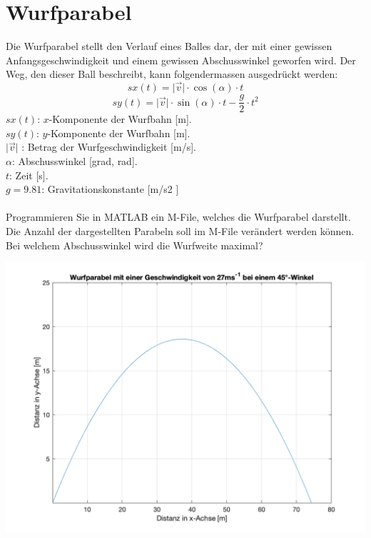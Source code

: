 \section{Wurfparabel}
Die Wurfparabel stellt den Verlauf eines Balles dar, der mit einer gewissen Anfangsgeschwindigkeit und einem gewissen Abschusswinkel geworfen wird.
Der Weg, den dieser Ball beschreibt, kann folgendermassen ausgedrückt werden:
\begin{equation}
sx\left(t\right)=\Big\vert\overrightarrow{v}\Big\vert\cdot \cos\left(\alpha\right)\cdot t
\end{equation}
\begin{equation}
sy\left(t\right)=\Big\vert\overrightarrow{v}\Big\vert\cdot\sin\left(\alpha\right)\cdot t-\dfrac{g}{2}\cdot t^2 
\end{equation}
$sx(t)$: $x$-Komponente der Wurfbahn [m].\\
$sy(t)$: $y$-Komponente der Wurfbahn [m].\\
$\Big\vert \overrightarrow{v}\Big\vert$ : Betrag der Wurfgeschwindigkeit [m/s].\\
$\alpha$: Abschusswinkel [grad, rad].\\
$t$: Zeit [s].\\
$g = 9.81$: Gravitationskonstante [m/s2
]\\\\
Programmieren Sie in MATLAB ein M-File, welches die Wurfparabel darstellt. Die Anzahl der
dargestellten Parabeln soll im M-File verändert werden können. Bei welchem Abschusswinkel
wird die Wurfweite maximal?  
\begin{center}
\includegraphics[scale=0.3]{../../PROJEKTE/ubungm3wurfparabel/ubungm3wurfparabel.png}
\end{center}

